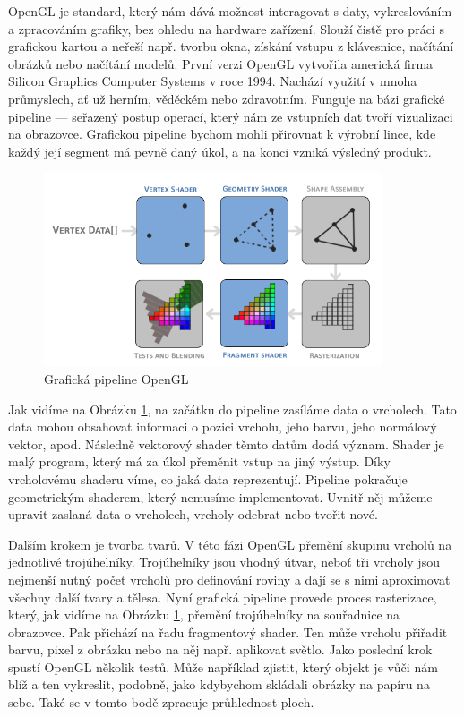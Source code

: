\documentclass[12pt]{article}
\begin{document}
OpenGL je standard, který nám dává možnost interagovat s daty, vykreslováním a zpracováním grafiky, bez ohledu na hardware zařízení. Slouží čistě pro práci s grafickou kartou a neřeší např. tvorbu okna, získání vstupu z klávesnice, načítání obrázků nebo načítání modelů. První verzi OpenGL vytvořila americká firma Silicon
Graphics Computer Systems v roce 1994. Nachází využití v mnoha průmyslech, ať už herním, věděckém nebo zdravotním. Funguje na bázi grafické pipeline — seřazený postup operací, který nám ze vstupních dat tvoří vizualizaci na obrazovce. Grafickou pipeline bychom mohli přirovnat k výrobní lince, kde každý její segment má pevně daný úkol, a na konci vzniká výsledný produkt.\cite{Shreiner_2013}

\vspace{0.5cm}
\begin{figure}[h]
    \centering
    \includegraphics[width=10cm]{images/opengl_pipeline.png}
    \caption[Grafická pipeline OpenGL]{Grafická pipeline OpenGL \cite{pipeline_img}}
    \label{fig:Grafická pipeline OpenGL}
\end{figure}
\pagebreak

Jak vidíme na Obrázku \ref{fig:Grafická pipeline OpenGL}, na začátku do pipeline zasíláme data o vrcholech. Tato data mohou obsahovat informaci o pozici vrcholu, jeho barvu, jeho normálový vektor, apod. Následně vektorový shader těmto datům dodá význam. Shader je malý program, který má za úkol přeměnit vstup na jiný výstup.\cite{lopgl_shaders} Díky vrcholovému shaderu víme, co jaká data reprezentují. Pipeline pokračuje geometrickým shaderem, který nemusíme implementovat. Uvnitř něj můžeme upravit zaslaná data o vrcholech, vrcholy odebrat nebo tvořit nové.\cite{lopgl_geometry_shader}

Dalším krokem je tvorba tvarů. V této fázi OpenGL přemění skupinu vrcholů na jednotlivé trojúhelníky. Trojúhelníky jsou vhodný útvar, neboť tři vrcholy jsou nejmenší nutný počet vrcholů pro definování roviny a dají se s nimi aproximovat všechny další tvary a tělesa. Nyní grafická pipeline provede proces rasterizace, který, jak vidíme na Obrázku \ref{fig:Grafická pipeline OpenGL}, přemění trojúhelníky na souřadnice na obrazovce. Pak přichází na řadu fragmentový shader. Ten může vrcholu přiřadit barvu, pixel z obrázku nebo na něj např. aplikovat světlo. Jako poslední krok spustí OpenGL několik testů. Může například zjistit, který objekt je vůči nám blíž a ten vykreslit, podobně, jako kdybychom skládali obrázky na papíru na sebe. Také se v tomto bodě zpracuje průhlednost ploch.
\end{document}
